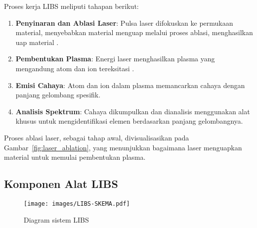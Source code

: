 Proses kerja LIBS meliputi tahapan berikut:
\begin{enumerate}
    \item \textbf{Penyinaran dan Ablasi Laser}: Pulsa laser difokuskan ke permukaan material, menyebabkan material menguap melalui proses ablasi, menghasilkan uap material \citep{Cremers2013}.
    \item \textbf{Pembentukan Plasma}: Energi laser menghasilkan plasma yang mengandung atom dan ion tereksitasi \citep{Miziolek2006}.
    \item \textbf{Emisi Cahaya}: Atom dan ion dalam plasma memancarkan cahaya dengan panjang gelombang spesifik.
    \item \textbf{Analisis Spektrum}: Cahaya dikumpulkan dan dianalisis menggunakan alat khusus untuk mengidentifikasi elemen berdasarkan panjang gelombangnya.
\end{enumerate}
Proses ablasi laser, sebagai tahap awal, divisualisasikan pada Gambar~\ref{fig:laser_ablation}, yang menunjukkan bagaimana laser menguapkan material untuk memulai pembentukan plasma.



\subsection{Komponen Alat LIBS}
\label{subsec:libs_setup}

\begin{figure}[H]
    \begin{center}
        \texttt{[image: images/LIBS-SKEMA.pdf]}
        \caption{Diagram sistem LIBS \citep{Cremers2013}}
        \label{fig:libs_setup}
    \end{center}
\end{figure}


